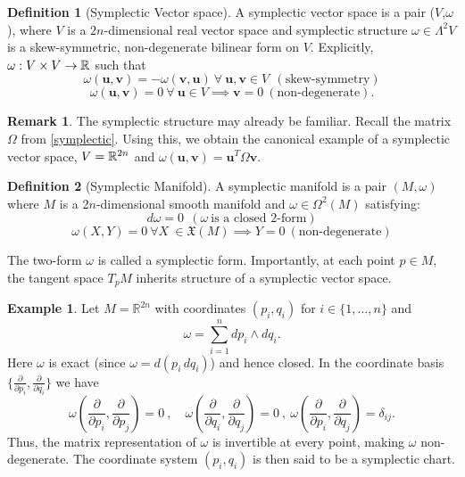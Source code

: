 \documentclass[12pt,oneside]{report}
\theoremstyle{definition}
\newtheorem{definition}{Definition}
\newtheorem{example}{Example}
\newtheorem{remark}{Remark}
\begin{document}
\begin{definition}[Symplectic Vector space] A symplectic vector space is a pair ($V$,$\omega$), where $V$ is a $2n$-dimensional real vector space and symplectic structure $\omega \in \Lambda^{2}V$ is a skew-symmetric, non-degenerate bilinear form on $V$. Explicitly, $\omega: V \times V \rightarrow \mathbb{R}$ such that 
$$\omega(\textbf{u},\textbf{v}) = -\omega(\textbf{v},\textbf{u}) \ \forall \ \textbf{u} ,\textbf{v} \in V \ \ (\text{skew-symmetry}) $$
$$\omega(\textbf{u},\textbf{v}) = 0 \ \forall \ \textbf{u} \in V  \implies \textbf{v} = 0 \ (\text{non-degenerate}). $$
    
\end{definition}
\begin{remark}\label{symplectic vector space example}
    The symplectic structure may already be familiar. Recall the matrix \( \Omega \) from \autoref{symplectic}. Using this, we obtain the canonical example of a symplectic vector space,  $V=\mathbb{R}^{2n}$ and $\omega(\textbf{u},\textbf{v}) = \textbf{u}^{T}\Omega \textbf{v}$.
\end{remark}

\begin{definition}[Symplectic Manifold]
    A symplectic manifold is a pair $(M,\omega)$ where $M$ is a 2$n$-dimensional smooth manifold and $\omega \in \Omega^{2}(M)$ satisfying:
    $$ d \omega = 0 \ \ (\omega \ \text{is a closed  2-form})$$
    $$ \omega(X,Y) = 0 \ \forall X \ \in \mathfrak{X}(M) \implies Y = 0 \ (\text{non-degenerate})$$
\end{definition}

The two-form $\omega$ is called a symplectic form. Importantly, at each point $p\in M$, the tangent space $T_{p}M$ inherits structure of a symplectic vector space.

\begin{example}
Let $M = \mathbb{R}^{2n}$ with coordinates $(p_i,q_i)$ for $i \in \{1,\dots,n\}$ and
\[
\omega = \sum_{i=1}^{n} dp_i \wedge dq_i.
\]
Here $\omega$ is exact (since $\omega = d(p_i\, dq_i)$) and hence closed. In the coordinate basis $\{\frac{\partial}{\partial p_i},\frac{\partial}{\partial q_i}\}$ we have
\[
\omega\left(\frac{\partial}{\partial p_i},\frac{\partial}{\partial p_j}\right)=0 \ , \quad \omega\left(\frac{\partial}{\partial q_i},\frac{\partial}{\partial q_j}\right)=0 \ , \ 
\omega\left(\frac{\partial}{\partial p_i},\frac{\partial}{\partial q_j}\right)=\delta_{ij}.
\]
Thus, the matrix representation of $\omega$ is invertible at every point, making $\omega$ non-degenerate. The coordinate system $(p_i,q_i)$ is then said to be a {symplectic chart}.
\end{example}
\end{document}
